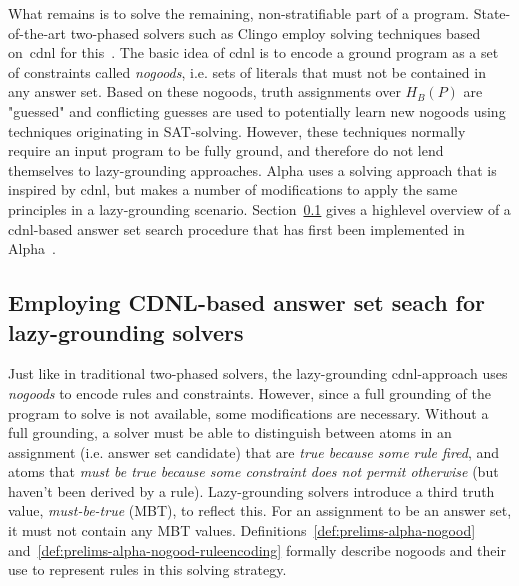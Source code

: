 What remains is to solve the remaining, non-stratifiable part of a program. State-of-the-art two-phased solvers such as Clingo employ solving techniques based on~\gls{cdnl} for this~\cite{clasp-cdnl}. The basic idea of \gls{cdnl} is to encode a ground program as a set of constraints called \emph{nogoods}, i.e. sets of literals that must not be contained in any answer set. Based on these nogoods, truth assignments over $H_B(P)$ are "guessed" and conflicting guesses are used to potentially learn new nogoods using techniques originating in SAT-solving. However, these techniques normally require an input program to be fully ground, and therefore do not lend themselves to lazy-grounding approaches. Alpha uses a solving approach that is inspired by \gls{cdnl}, but makes a number of modifications to apply the same principles in a lazy-grounding scenario. Section~\ref{subsec:prelims-lazygrounding-alpha-cdnl} gives a highlevel overview of a \gls{cdnl}-based answer set search procedure that has first been implemented in Alpha~\cite{lazy-cdnl}.

\subsection{Employing CDNL-based answer set seach for lazy-grounding solvers}
\label{subsec:prelims-lazygrounding-alpha-cdnl}

Just like in traditional two-phased solvers, the lazy-grounding \gls{cdnl}-approach uses \emph{nogoods} to encode rules and constraints. However, since a full grounding of the program to solve is not available, some modifications are necessary. Without a full grounding, a solver must be able to distinguish between atoms in an assignment (i.e. answer set candidate) that are \emph{true because some rule fired}, and atoms that \emph{must be true because some constraint does not permit otherwise} (but haven't been derived by a rule). Lazy-grounding solvers introduce a third truth value, \emph{must-be-true} (MBT), to reflect this. For an assignment to be an answer set, it must not contain any MBT values. Definitions~\ref{def:prelims-alpha-nogood} and~\ref{def:prelims-alpha-nogood-ruleencoding} formally describe nogoods and their use to represent rules in this solving strategy.

